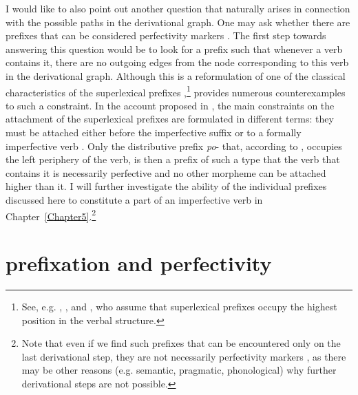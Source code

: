 I would like to also point out another question that naturally arises in connection with the possible paths in the derivational graph. One may ask whether there are prefixes that can be considered perfectivity markers . The first step towards answering this question would be to look for a prefix such that whenever a verb contains it, there are no outgoing edges from the node corresponding to this verb in the derivational graph. Although this is a reformulation of one of the classical characteristics of the superlexical prefixes ,\footnote{See, e.g. \citet{Ramchand:04}, \citet{Svenonius:04a}, and \citet{Romanova:06}, who assume that superlexical prefixes  occupy the highest position in the verbal structure.} \citet{Tatevosov:07, Tatevosov:09} provides numerous counterexamples to such a constraint. In the account proposed in \citealt{Tatevosov:09}, the main constraints on the attachment of the superlexical prefixes  are formulated in different terms: they must be attached either before the imperfective suffix   or to a formally imperfective verb . Only the distributive  prefix \textit{po}- that, according to \citet{Tatevosov:09}, occupies the left periphery  of the verb, is then a prefix of such a type that the verb that contains it is necessarily perfective and no other morpheme can be attached higher than it. I will further investigate the ability of the individual prefixes discussed here to constitute a part of an imperfective verb  in Chapter~\ref{Chapter5}.\footnote{Note that even if we find such prefixes that can be encountered only on the last derivational step, they are not necessarily perfectivity markers , as there may be other reasons (e.g. semantic, pragmatic, phonological) why further derivational steps are not possible.}

\section{prefixation  and perfectivity}\label{section:new:perfectivity}

